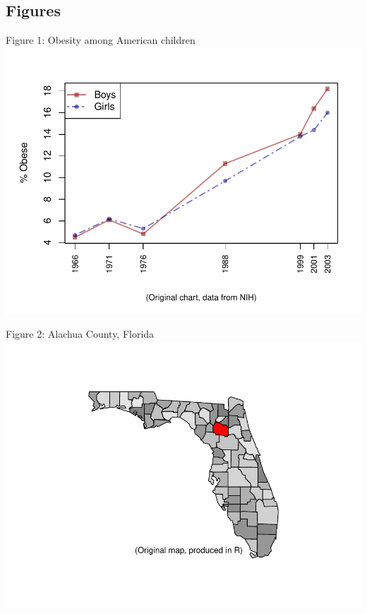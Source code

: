 \documentclass[11pt]{article}
\begin{document}
\subsection*{Figures}
\begin{center}
Figure 1: Obesity among American children\cite{NIH}
\includegraphics{loi-001}
\end{center}


\begin{center}
Figure 2: Alachua County, Florida\cite{maps}
\includegraphics{loi-002}
\end{center}


\end{document}
